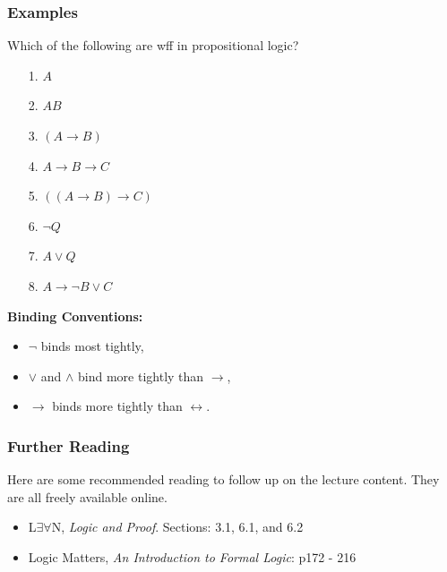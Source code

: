 \documentclass{beamer}
\theoremstyle{indentDefn} \newtheorem{defn}[]{Definition}
\begin{document}
\begin{frame}
	\frametitle{Examples}
	Which of the following are wff in propositional logic?
	
	\begin{itemize}
		\item[1.] $A$
		\item[2.] $AB$
		\item[3.] $(A \rightarrow B)$
		\item[4.] $A \rightarrow B \rightarrow C$
		\item[5.] $((A \rightarrow B) \rightarrow C)$
		\item[6.] $\lnot Q$
		\item[7.] $A \lor Q$
		\item[8.] $A \rightarrow \lnot B \lor C$		
	\end{itemize}
		
	\pause
		
	{\bf Binding Conventions:} %
	\begin{itemize}
		\item $\lnot$ binds most tightly, 
		\item $\lor$ and $\land$ bind more tightly than $\rightarrow$,
		\item $\rightarrow$ binds more tightly than $\leftrightarrow$. 			
	\end{itemize}
	
\end{frame}



\begin{frame}
  \frametitle{Further Reading}

  Here are some recommended reading to follow up on the lecture content. They are all freely available online. 

	\vspace{0.5cm}

	\begin{itemize}
		\item L$\exists \forall$N, \emph{Logic and Proof}. Sections: 3.1, 6.1, and 6.2 
		\item Logic Matters, \emph{An Introduction to Formal Logic}: p172 - 216
	\end{itemize}

\end{frame}
\end{document}
